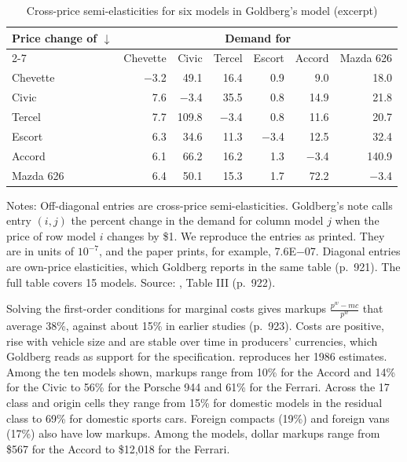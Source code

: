 \begin{table}[htbp]
\centering
\caption{Cross-price semi-elasticities for six models in Goldberg's model (excerpt)}
\label{tab:08-gold-cross}
\footnotesize
\begin{tabular}{@{}lrrrrrr@{}}
\toprule
Price change of $\downarrow$ & \multicolumn{6}{c}{Demand for} \\
\cmidrule(l){2-7}
 & Chevette & Civic & Tercel & Escort & Accord & Mazda 626 \\
\midrule
Chevette & $-$3.2 & 49.1 & 16.4 & 0.9 & 9.0 & 18.0 \\
Civic & 7.6 & $-$3.4 & 35.5 & 0.8 & 14.9 & 21.8 \\
Tercel & 7.7 & 109.8 & $-$3.4 & 0.8 & 11.6 & 20.7 \\
Escort & 6.3 & 34.6 & 11.3 & $-$3.4 & 12.5 & 32.4 \\
Accord & 6.1 & 66.2 & 16.2 & 1.3 & $-$3.4 & 140.9 \\
Mazda 626 & 6.4 & 50.1 & 15.3 & 1.7 & 72.2 & $-$3.4 \\
\bottomrule
\end{tabular}

\smallskip
\begin{minipage}{0.86\linewidth}
\footnotesize Notes: Off-diagonal entries are cross-price semi-elasticities. Goldberg's note calls entry $(i, j)$ the
percent change in the demand for column model $j$ when the price of row model $i$ changes by \$1. We reproduce the
entries as printed. They are in units of $10^{-7}$, and the paper prints, for example,
7.6E$-$07. Diagonal entries are own-price elasticities, which Goldberg reports in the same table (p.~921). The full
table covers 15 models. Source: \citet{Goldberg1995}, Table III (p.~922).
\end{minipage}
\end{table}

 Solving the first-order conditions for marginal costs gives markups
$\frac{p^w - mc}{p^w}$ that average 38\%, against about 15\% in earlier studies (p.~923). Costs are positive,
rise with vehicle size and are stable over time in producers' currencies, which Goldberg reads as support for the
specification.  reproduces her 1986 estimates. Among the ten models shown, markups range
from 10\% for the Accord and 14\% for the Civic to 56\% for the Porsche 944 and 61\% for the Ferrari. Across the 17
class and origin cells they range from 15\% for domestic models in the residual class to 69\% for domestic sports
cars. Foreign compacts (19\%) and foreign vans (17\%) also have low markups. Among the models, dollar markups range
from \$567 for the Accord to \$12,018 for the Ferrari.

